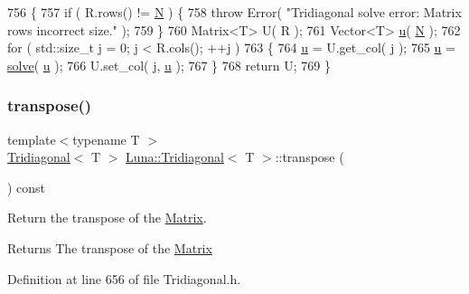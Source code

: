 \begin{DoxyCode}
756   \{
757     \textcolor{keywordflow}{if} ( R.rows() != \hyperlink{namespaceHeat__plot_a7d050092798e28458a263710837bda77}{N} ) \{
758       \textcolor{keywordflow}{throw} Error( \textcolor{stringliteral}{"Tridiagonal solve error: Matrix rows incorrect size."} );
759     \}
760     Matrix<T> U( R );
761     Vector<T> \hyperlink{namespaceHeat__plot_ae622b86afa46daa3e9b887624ab1bf26}{u}( \hyperlink{namespaceHeat__plot_a7d050092798e28458a263710837bda77}{N} );
762     \textcolor{keywordflow}{for} ( std::size\_t j = 0; j < R.cols(); ++j )
763     \{
764       \hyperlink{namespaceHeat__plot_ae622b86afa46daa3e9b887624ab1bf26}{u} = U.get\_col( j );
765       \hyperlink{namespaceHeat__plot_ae622b86afa46daa3e9b887624ab1bf26}{u} = \hyperlink{classLuna_1_1Tridiagonal_a760fdf1ceb44e2ff380770eefb13d023}{solve}( \hyperlink{namespaceHeat__plot_ae622b86afa46daa3e9b887624ab1bf26}{u} );
766       U.set\_col( j, \hyperlink{namespaceHeat__plot_ae622b86afa46daa3e9b887624ab1bf26}{u} );
767     \}
768     \textcolor{keywordflow}{return} U;
769   \}
\end{DoxyCode}
\mbox{\label{classLuna_1_1Tridiagonal_ad4a4209b7a20a65fce5c66444af3249e}} 
\subsubsection{\texorpdfstring{transpose()}{transpose()}}
{\footnotesize\ttfamily template$<$typename T $>$ \\
\hyperlink{classLuna_1_1Tridiagonal}{Tridiagonal}$<$ T $>$ \hyperlink{classLuna_1_1Tridiagonal}{Luna\+::\+Tridiagonal}$<$ T $>$\+::transpose (\begin{DoxyParamCaption}{ }\end{DoxyParamCaption}) const\hspace{0.3cm}{\ttfamily [inline]}}



Return the transpose of the \hyperlink{classLuna_1_1Matrix}{Matrix}. 

\begin{DoxyReturn}{Returns}
The transpose of the \hyperlink{classLuna_1_1Matrix}{Matrix} 
\end{DoxyReturn}


Definition at line 656 of file Tridiagonal.\+h.



